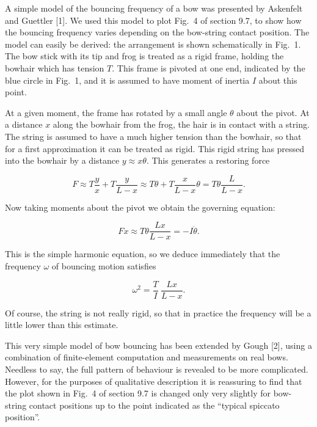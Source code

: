  A simple model of the bouncing frequency of a bow was presented by Askenfelt 
  and Guettler [1]. We used this model to plot Fig.\ 4 of section 9.7, to show 
  how the bouncing frequency varies depending on the bow-string contact 
  position. The model can easily be derived: the arrangement is shown 
  schematically in Fig.\ 1. The bow stick with its tip and frog is treated as a 
  rigid frame, holding the bowhair which has tension $T$. This frame is pivoted 
  at one end, indicated by the blue circle in Fig.\ 1, and it is assumed to 
  have moment of inertia $I$ about this point. 


  At a given moment, the frame has rotated by a small angle $\theta$ about the 
  pivot. At a distance $x$ along the bowhair from the frog, the hair is in 
  contact with a string. The string is assumed to have a much higher tension 
  than the bowhair, so that for a first approximation it can be treated as 
  rigid. This rigid string has pressed into the bowhair by a distance $y 
  \approx x \theta$. This generates a restoring force 

  $$F \approx T \frac{y}{x} +T \frac{y}{L-x} \approx T \theta + T \frac{x}{L-x} 
  \theta = T \theta \frac{L}{L-x} . \tag{1}$$ 

  Now taking moments about the pivot we obtain the governing equation: 

  $$Fx \approx T \theta \frac{Lx}{L-x} =-I \ddot{\theta} . \tag{2}$$ 

  This is the simple harmonic equation, so we deduce immediately that the 
  frequency $\omega$ of bouncing motion satisfies 

  $$\omega^2=\frac{T}{I}~\frac{Lx}{L-x} . \tag{3}$$ 

  Of course, the string is not really rigid, so that in practice the frequency 
  will be a little lower than this estimate. 

  This very simple model of bow bouncing has been extended by Gough [2], using 
  a combination of finite-element computation and measurements on real bows. 
  Needless to say, the full pattern of behaviour is revealed to be more 
  complicated. However, for the purposes of qualitative description it is 
  reassuring to find that the plot shown in Fig.\ 4 of section 9.7 is changed 
  only very slightly for bow-string contact positions up to the point indicated 
  as the ``typical spiccato position''. 

